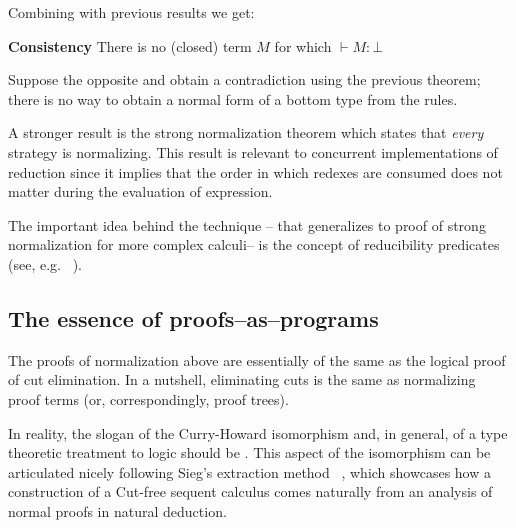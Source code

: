 Combining with previous results we get:
\begin{theorem}
\begin{mdframed}
\textbf{Consistency}
There is no (closed) term $M$ for which $\vdash M:\bot$ 
\end{mdframed}
\end{theorem}
 Suppose the opposite and obtain a contradiction 
 using the previous theorem; there is no way to obtain a normal form of a bottom type from the rules.  
 
 A stronger result is the strong normalization theorem which states that \textit{every} 
 strategy is normalizing. This result is relevant to concurrent 
 implementations of reduction since it implies that the order 
 in which redexes are consumed does not matter during the evaluation of  expression. 
 
 The important idea behind the technique -- that generalizes to proof of 
 strong normalization for more complex calculi-- is the concept of  reducibility predicates (see, e.g. ~\cite{prawitz1971ideas}). 
 

\subsection{The essence of proofs--as--programs }
The proofs of normalization above are essentially of the same 
  as the logical proof of cut elimination. 
In a nutshell, eliminating cuts is the same as normalizing proof 
terms (or, correspondingly, proof trees).

In reality, the slogan of the Curry-Howard isomorphism and, 
in general, of a type theoretic treatment to logic should be . 
This aspect of the isomorphism can be articulated 
nicely following Sieg's extraction method ~\cite{Sieg1998}, which  
showcases how a construction of a Cut-free sequent 
calculus comes naturally from an analysis of normal proofs 
in natural deduction. 
